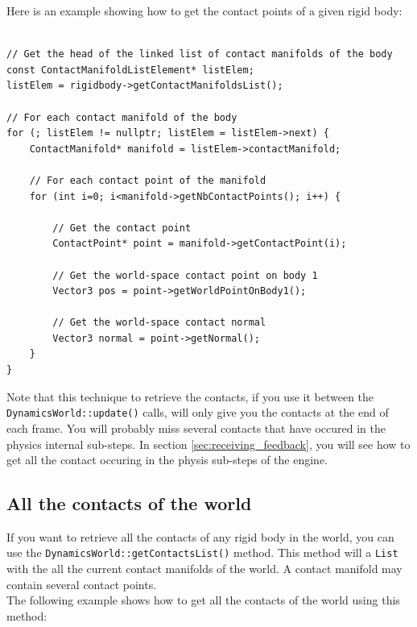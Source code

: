 \documentclass[a4paper,12pt]{article}
\begin{document}
    Here is an example showing how to get the contact points of a given rigid body: \\

    \begin{lstlisting}

// Get the head of the linked list of contact manifolds of the body
const ContactManifoldListElement* listElem;
listElem = rigidbody->getContactManifoldsList();

// For each contact manifold of the body
for (; listElem != nullptr; listElem = listElem->next) {
    ContactManifold* manifold = listElem->contactManifold;

    // For each contact point of the manifold
    for (int i=0; i<manifold->getNbContactPoints(); i++) {

        // Get the contact point
        ContactPoint* point = manifold->getContactPoint(i);

        // Get the world-space contact point on body 1
        Vector3 pos = point->getWorldPointOnBody1();

        // Get the world-space contact normal
        Vector3 normal = point->getNormal();
    }
}
    \end{lstlisting}

     \vspace{0.6cm}

    Note that this technique to retrieve the contacts, if you use it between the \texttt{Dynamics\allowbreak World::update()} calls, will only give you the contacts at the end of
    each frame. You will probably miss several contacts that have occured in the physics internal sub-steps. In section \ref{sec:receiving_feedback}, you will
    see how to get all the contact occuring in the physis sub-steps of the engine. 

    \subsection{All the contacts of the world}

    If you want to retrieve all the contacts of any rigid body in the world, you can use the \texttt{DynamicsWorld::getContactsList()} method. This method will
    a \texttt{List} with the all the current contact manifolds of the world. A contact manifold may contain several contact points. \\

    The following example shows how to get all the contacts of the world using this method: \\
\end{document}
